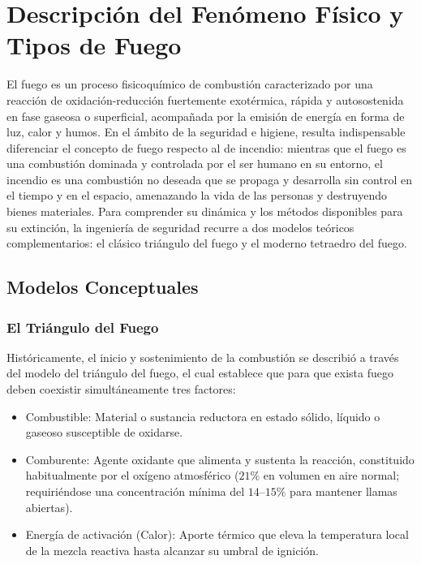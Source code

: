 \chapter{Descripción del Fenómeno Físico y Tipos de Fuego}
\label{sec.cap2:fenomeno_fisico}

El fuego es un proceso fisicoquímico de combustión caracterizado por una reacción de oxidación-reducción fuertemente
exotérmica, rápida y autosostenida en fase gaseosa o superficial, acompañada por la emisión de energía en forma de luz,
calor y humos. En el ámbito de la seguridad e higiene, resulta indispensable diferenciar el concepto de fuego respecto al
de incendio: mientras que el fuego es una combustión dominada y controlada por el ser humano en su entorno, el incendio es
una combustión no deseada que se propaga y desarrolla sin control en el tiempo y en el espacio, amenazando la vida de las
personas y destruyendo bienes materiales. Para comprender su dinámica y los métodos disponibles para su extinción, la
ingeniería de seguridad recurre a dos modelos teóricos complementarios: el clásico triángulo del fuego y el moderno
tetraedro del fuego.

\section{Modelos Conceptuales}
\label{sec.cap2:modelos_fuego}

\subsection{El Triángulo del Fuego}

Históricamente, el inicio y sostenimiento de la combustión se describió a través del modelo del triángulo del fuego,
el cual establece que para que exista fuego deben coexistir simultáneamente tres factores:

\begin{itemize}
    \item Combustible: Material o sustancia reductora en estado sólido, líquido o gaseoso susceptible de oxidarse.
    \item Comburente: Agente oxidante que alimenta y sustenta la reacción, constituido habitualmente por el oxígeno
          atmosférico ($21\percent$ en volumen en aire normal; requiriéndose una concentración mínima del $14\text{--}15\percent$
          para mantener llamas abiertas).
    \item Energía de activación (Calor): Aporte térmico que eleva la temperatura local de la mezcla reactiva hasta
          alcanzar su umbral de ignición.
\end{itemize}

